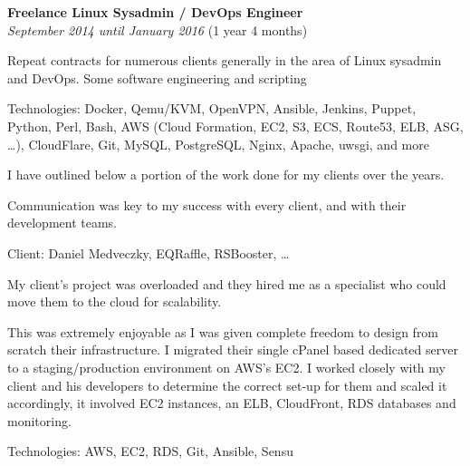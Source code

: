 \documentclass[12pt]{article}
\newenvironment{outerlist}[1][\enskip\textbullet]%
	{\begin{itemize}[#1]}{\end{itemize}%
		\vspace{-.6\baselineskip}}
\newenvironment{innerlist}[1][\enskip\textbullet]%
	{\begin{compactitem}[#1]}{\end{compactitem}}
\newcommand{\halfblankline}{\quad\vspace{-0.5\baselineskip}\pagebreak[3]}
\begin{document}
\begin{outerlist}
			\item[] \textbf{Freelance Linux Sysadmin / DevOps Engineer} \\
			\textit{September 2014 until January 2016} (1 year 4 months)
			\begin{innerlist}
				\item Repeat contracts for numerous clients generally in the area of Linux sysadmin and DevOps. Some software engineering and scripting
				\item Technologies: Docker, Qemu/KVM, OpenVPN, Ansible, Jenkins, Puppet, Python, Perl, Bash, AWS (Cloud Formation, EC2, S3, ECS, Route53, ELB, ASG,  \ldots), CloudFlare, Git, MySQL, PostgreSQL, Nginx, Apache, uwsgi, and more
				\item I have outlined below a portion of the work done for my clients over the years.
				\item Communication was key to my success with every client, and with their development teams.
			\end{innerlist}
			\item[] Client: Daniel Medveczky, EQRaffle, RSBooster, \ldots
			\begin{innerlist}
				\item My client's project was overloaded and they hired me as a specialist who could move them to the cloud for scalability.
				\item This was extremely enjoyable as I was given complete freedom to design from scratch their infrastructure. I migrated their single cPanel based dedicated server to a staging/production environment on AWS's EC2. I worked closely with my client and his developers to determine the correct set-up for them and scaled it accordingly, it involved EC2 instances, an ELB, CloudFront, RDS databases and monitoring.
				\item Technologies: AWS, EC2, RDS, Git, Ansible, Sensu
			\end{innerlist} 
			\halfblankline %
			

\end{outerlist}
\end{document}
